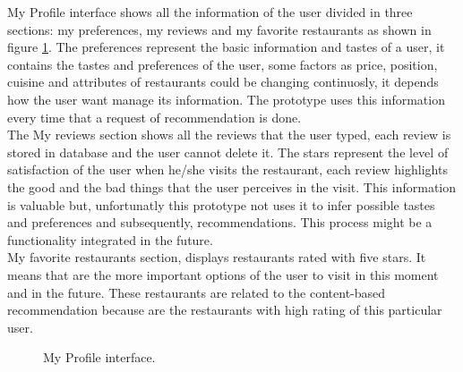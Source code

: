 My Profile interface shows all the information of the user divided in
three sections: my preferences, my reviews and my favorite restaurants
as shown in figure \ref{fig:myprofile}. The preferences represent the basic
information and tastes of a user, it contains the tastes and preferences
of the user, some factors as price, position, cuisine and attributes
of restaurants could be changing continuosly, it depends how the user
want manage its information. The prototype uses this information every
time that a request of recommendation is done.\\
The My reviews section shows all the reviews that the user typed, each
review is stored in database and the user cannot delete it. The stars
represent the level of satisfaction of the user when he/she visits the
restaurant, each review highlights the good and the bad things that
the user perceives in the visit. This information is valuable but,
unfortunatly this prototype not uses it to infer possible tastes and
preferences and subsequently, recommendations. This process might be a
functionality integrated in the future.\\
My favorite restaurants section, displays restaurants rated with five
stars. It means that are the more important options of the user to
visit in this moment and in the future. These restaurants are related
to the content-based recommendation because are the restaurants with
high rating of this particular user.
\begin{figure}
\captionsetup{font=footnotesize}
\centering
{}
\caption{My Profile interface.}
\label{fig:myprofile}   
\end{figure}

